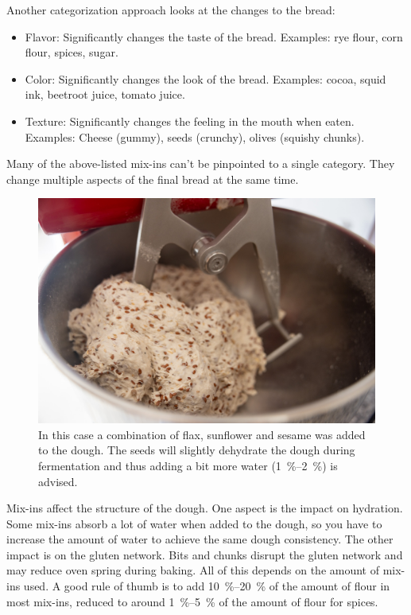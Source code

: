 Another categorization approach looks at the changes to the bread:

\begin{itemize}
  \item Flavor: Significantly changes the taste of the bread. Examples: rye
      flour, corn flour, spices, sugar.
  \item Color: Significantly changes the look of the bread. Examples: cocoa,
      squid ink, beetroot juice, tomato juice.
  \item Texture: Significantly changes the feeling in the mouth when eaten.
      Examples: Cheese (gummy), seeds (crunchy), olives (squishy chunks).
\end{itemize}

Many of the above-listed mix-ins can't be pinpointed to a single category. They
change multiple aspects of the final bread at the same time.

\begin{figure}[htb!]
  \centering
  \includegraphics[width=\textwidth]{seeded-sourdough}
  \caption[Seeded sourdough]{In this case a combination of flax, sunflower and
    sesame was added to the dough. The seeds will slightly dehydrate the dough
    during fermentation and thus adding a bit more water
    (\qtyrange{1}{2}{\percent}) is advised.}%
\end{figure}

Mix-ins affect the structure of the dough. One aspect is the impact on
hydration. Some mix-ins absorb a lot of water when added to the dough, so you
have to increase the amount of water to achieve the same dough consistency.
The other impact is on the gluten network. Bits and chunks disrupt the gluten
network and may reduce oven spring during baking. All of this depends on the amount of mix-ins
used. A good rule of thumb is to add \qtyrange{10}{20}{\percent} of the amount
of flour in most mix-ins, reduced to around \qtyrange{1}{5}{\percent} of the
amount of flour for spices.

